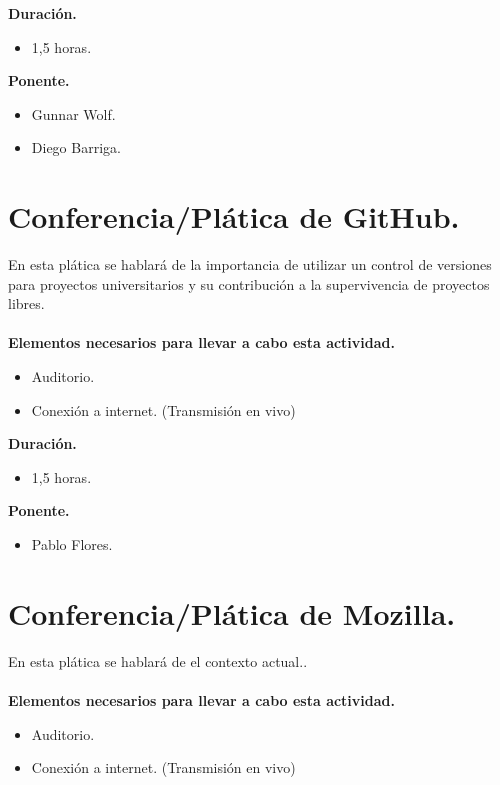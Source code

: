 \documentclass[a4paper,11pt]{article}                 %
\begin{document}
  \textbf{Duración.}
  \begin{itemize}
    \item 1,5 horas.
  \end{itemize}
  
    \textbf{Ponente.}
  \begin{itemize}
    \item Gunnar Wolf.
    \item Diego Barriga.
  \end{itemize}
  

  
  \section{Conferencia/Plática de GitHub.}                                     %
   En esta plática se hablará de la importancia de utilizar un control de versiones para proyectos universitarios y su contribución a la supervivencia de proyectos libres.
      \paragraph{}
  \textbf{Elementos necesarios para llevar a cabo esta actividad.}
  \begin{itemize}
    \label{list:github}
    \item Auditorio.
        \item Conexión a internet. (Transmisión en vivo)
  \end{itemize}
  
  \textbf{Duración.}
  \begin{itemize}
    \item 1,5 horas.
  \end{itemize}
  
        \textbf{Ponente.}
  \begin{itemize}
    \item Pablo Flores.
  \end{itemize}
  
    \vspace{1 cm}
  
    \section{Conferencia/Plática de Mozilla.}                                     %
 En esta plática se hablará de el contexto actual..
      \paragraph{}
  \textbf{Elementos necesarios para llevar a cabo esta actividad.}
  \begin{itemize}
    \label{list:mozilla}
    \item Auditorio.
        \item Conexión a internet. (Transmisión en vivo)
  \end{itemize}
  
\end{document}
